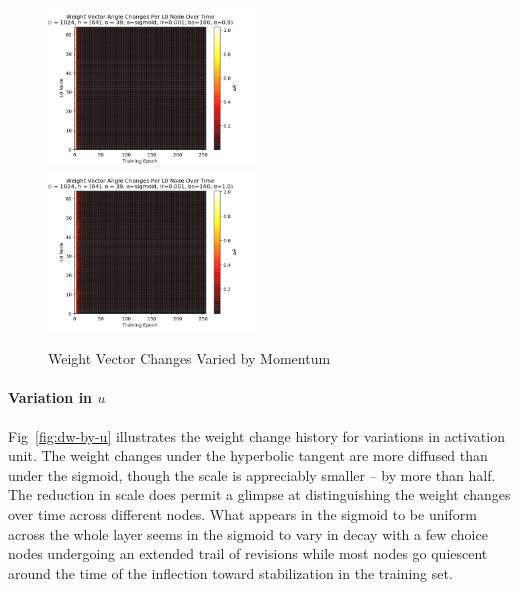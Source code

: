 \documentclass[10pt,epsf]{article}
\begin{document}
{{\begin{figure}[H]
      \includegraphics[width=0.5\textwidth]{./img/64-0.001-160-0.9-sigmoid-1/weight-angle-changes-L0-255.png}
      \includegraphics[width=0.5\textwidth]{./img/64-0.001-160-1-sigmoid-1/weight-angle-changes-L0-255.png}
      \caption{Weight Vector Changes Varied by Momentum}
      \label{fig:dw-by-m}
    \end{figure}
    \paragraph{Variation in $u$}{
      Fig~\ref{fig:dw-by-u} illustrates the weight change history for variations in activation unit.
      The weight changes under the hyperbolic tangent are more
      diffused than under the sigmoid, though the scale is appreciably smaller -- by more than half.
      The reduction in scale does permit a glimpse at distinguishing the weight changes over time
      across different nodes. What appears in the sigmoid to be uniform across the whole layer
      seems in the sigmoid to vary in decay with a few choice nodes undergoing an extended trail
      of revisions while most nodes go quiescent around the time of the inflection toward
      stabilization in the training set.

}}}
\end{document}
